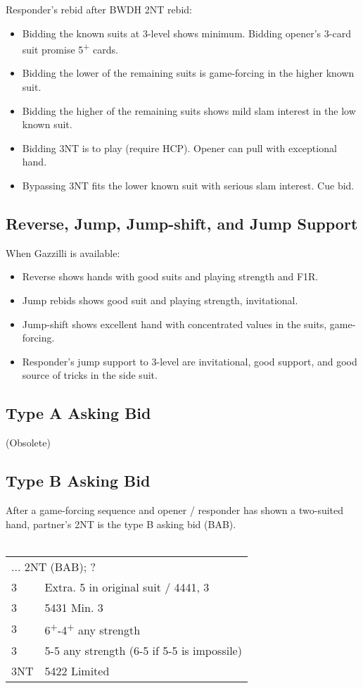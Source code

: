 \documentclass{article}
\renewcommand{\sp}{\ensuremath\spadesuit}
\newcommand{\he}{\ensuremath\heartsuit}
\newcommand{\di}{\ensuremath\diamondsuit}
\newcommand{\cl}{\ensuremath\clubsuit}
\newcommand{\nt}{\relsize{-1}NT\relsize{1}}
\newcommand{\up}{\textsuperscript{+}}
\begin{document}
\medskip

Responder's rebid after BWDH 2\nt{} rebid:
\begin{itemize}
    \itemsep0em
    \item Bidding the known suits at 3-level shows minimum. Bidding opener's 3-card suit promise 5\up{} cards.
    \item Bidding the lower of the remaining suits is game-forcing in the higher known suit.
    \item Bidding the higher of the remaining suits shows mild slam interest in the low known suit.
    \item Bidding 3\nt{} is to play (require HCP). Opener can pull with exceptional hand.
    \item Bypassing 3\nt{} fits the lower known suit with serious slam interest. Cue bid.
\end{itemize}

\subsection{Reverse, Jump, Jump-shift, and Jump Support}
When Gazzilli is available: 
\begin{itemize}
    \itemsep0em
    \item Reverse shows hands with good suits and playing strength and F1R.
    \item Jump rebids shows good suit and playing strength, invitational.
    \item Jump-shift shows excellent hand with concentrated values in the suits, game-forcing.
    \item Responder's jump support to 3-level are invitational, good support, and good source of tricks in the side suit.
\end{itemize}

\subsection{Type A Asking Bid}
(Obsolete)

\subsection{Type B Asking Bid}
After a game-forcing sequence and opener / responder has shown a two-suited hand, partner's 2\nt{} is the type B asking bid (BAB). \\\\
\begin{tabular}{|l|p{6.5cm}}
	\multicolumn{2}{l}{... 2\nt{} (BAB); ? } \\
    3\cl{} & Extra. 5 in original suit / 4441, 3\di{} is asking \\
    3\di{} & 5431 Min. 3\he{} is asking \\
    3\he{}& 6\up{}-4\up{} any strength \\
    3\sp{} & 5-5 any strength (6-5 if 5-5 is impossile) \\
    3\nt & 5422 Limited
\end{tabular}
\end{document}
